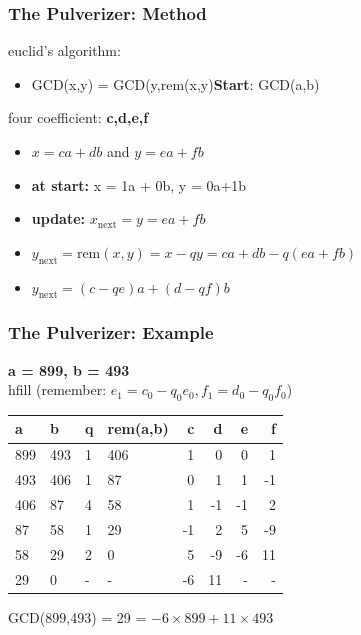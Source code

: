 \documentclass{beamer}
\begin{document}
\begin{frame}
  \frametitle{The Pulverizer: Method}

  {\larger
     euclid's algorithm:
    \begin{itemize}
    \item GCD(x,y) = GCD(y,rem(x,y)\hfill {\bf Start}: GCD(a,b)
    \end{itemize}

    \bigskip
    
     four coefficient: {\bf c,d,e,f}
    \begin{itemize}
    \item $x = ca+db$ and $y = ea+fb$
    \item {\bf at start:} x = 1a + 0b, y = 0a+1b
    \item {\bf update:} $x_{\text{next}} = y = ea + fb$
    \item $y_{\text{next}} =
      \text{rem}(x,y) = x - qy =
      ca+db-q(ea+fb)$
    \item $y_{\text{next}} = (c-qe)a+(d-qf)b$
    \end{itemize}
  }
\end{frame}

\begin{frame}
  \frametitle{The Pulverizer: Example}

  {\larger
    {\bf a = 899, b = 493}\\
    hfill (remember: $e_1 = c_0-q_0e_0, f_1 = d_0 - q_0f_0$) 

    \vfill
    
    \begin{tabular}{l|l|l|l|r|r|r|r}
      a & b & q & rem(a,b) & c & d & e & f\\
      \hline
      899 & 493 & 1 & 406 & 1 & 0 & 0 & 1\\
      493 & 406 & 1 & 87 & 0 & 1 & 1 & -1\\
      406 & 87 & 4 & 58 & 1 & -1 & -1 & 2\\
      87 & 58 & 1 & 29 & -1 & 2 & 5 & -9\\
      58 & 29 & 2 & 0 & 5 & -9 & -6 & 11\\
      29 & 0 & - & - & -6 & 11 & - & -\\      
    \end{tabular}

    \begin{center}
      GCD(899,493) = 29 = $-6\times 899 +11\times 493$
    \end{center}
  }  
\end{frame}
\end{document}
